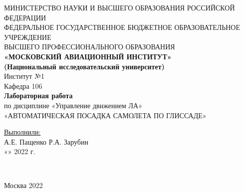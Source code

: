 \begin{center}
    \hfill \break
    \large{МИНИСТЕРСТВО НАУКИ И ВЫСШЕГО ОБРАЗОВАНИЯ РОССИЙСКОЙ ФЕДЕРАЦИИ }\\
    \footnotesize{ФЕДЕРАЛЬНОЕ ГОСУДАРСТВЕННОЕ БЮДЖЕТНОЕ ОБРАЗОВАТЕЛЬНОЕ УЧРЕЖДЕНИЕ}\\ 
    \footnotesize{ВЫСШЕГО ПРОФЕССИОНАЛЬНОГО ОБРАЗОВАНИЯ}\\
    \small{\textbf{«МОСКОВСКИЙ АВИАЦИОННЫЙ ИНСТИТУТ»\\(Национальный исследовательский университет)}}\\ \hline
    \hfill \break
    \normalsize{Институт №1}\\
    \normalsize{Кафедра 106}\\
    \hfill\break
    \hfill \break 
    \hfill \break 
    \hfill \break 
\hfill \break 
    \large{\textbf{Лабораторная работа} \\ по дисциплине «Управление движением ЛА» }\\

    \normalsize{«АВТОМАТИЧЕСКАЯ ПОСАДКА САМОЛЕТА ПО ГЛИССАДЕ»}\\
\end{center}
\hfill \break

\normalsize{ 
\begin{flushleft}
\hfill \break 
\hfill \break 
\hfill \break 
\hfill \break 
\hfill \break 
\hfill \break 
\hfill \break 
\hfill \break 
\hfill \break 
    \underline{Выполнили:} \\ \hfill \break 
    А.Е. Пащенко Р.А. Зарубин\\
    «\underline{\hspace{1cm}}» \underline{\hspace{3cm}} 2022 г. \\ \hfill \break
\end{flushleft}
}\\

\begin{center} Москва 2022 \end{center}
\thispagestyle{empty} %
 \newpage
